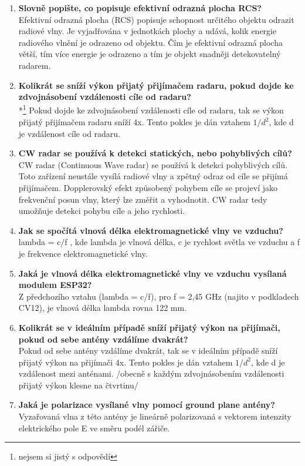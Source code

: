 \documentclass{article}
\begin{document}
\begin{enumerate}
        \item \textbf{Slovně popište, co popisuje efektivní odrazná plocha RCS?} \\[0.6em] { Efektivní odrazná plocha (RCS) popisuje schopnost určitého objektu odrazit radiové vlny. Je vyjadřována v jednotkách plochy a udává, kolik energie radiového vlnění je odrazeno od objektu. Čím je efektivní odrazná plocha větší, tím více energie je odrazeno a tím je objekt snadněji detekovatelný radarem.}
        \item \textbf{Kolikrát se sníží výkon přijatý přijímačem radaru, pokud dojde ke zdvojnásobení vzdálenosti cíle od radaru?} \\[0.6em] {*\footnote[7]{nejsem si jistý s odpovědí} Pokud dojde ke zdvojnásobení vzdálenosti cíle od radaru, tak se výkon přijatý přijímačem radaru sníží 4x. Tento pokles je dán vztahem $1/d^2$, kde d je vzdálenost cíle od radaru.}
        \item \textbf{CW radar se používá k detekci statických, nebo pohyblivých cílů?} \\[0.6em] { CW radar (Continuous Wave radar) se používá k detekci pohyblivých cílů. Toto zařízení neustále vysílá radiové vlny a zpětný odraz od cíle se přijímá přijímačem. Dopplerovský efekt způsobený pohybem cíle se projeví jako frekvenční posun vlny, který lze změřit a vyhodnotit. CW radar tedy umožňuje detekci pohybu cíle a jeho rychlosti.}
        \item \textbf{Jak se spočítá vlnová délka elektromagnetické vlny ve vzduchu?} \\[0.6em] { lambda = c/f , kde lambda je vlnová délka, c je rychlost světla ve vzduchu a f je frekvence elektromagnetické vlny.}
        \item \textbf{Jaká je vlnová délka elektromagnetické vlny ve vzduchu vysílaná modulem ESP32?} \\[0.6em] {Z předchozího vztahu (lambda = c/f), pro f = 2,45 GHz (najito v podkladech CV12), je vlnová délka lambda rovna 122 mm.}
        \item \textbf{Kolikrát se v ideálním případě sníží přijatý výkon na přijímači, pokud od sebe antény vzdálíme dvakrát?} \\[0.6em] {Pokud od sebe antény vzdálíme dvakrát, tak se v ideálním případě sníží přijatý výkon na přijímači 4x. Tento pokles je dán vztahem $1/d^2$, kde d je vzdálenost mezi anténami. /obecně s každým zdvojnásobením vzdálenosti přijatý výkon klesne na čtvrtinu/}
        \item \textbf{Jaká je polarizace vysílané vlny pomocí ground plane antény?} \\[0.6em] { Vyzařovaná vlna z této antény je lineárně polarizovaná s vektorem intenzity elektrického pole E ve směru podél zářiče.}

\end{enumerate}
\end{document}
